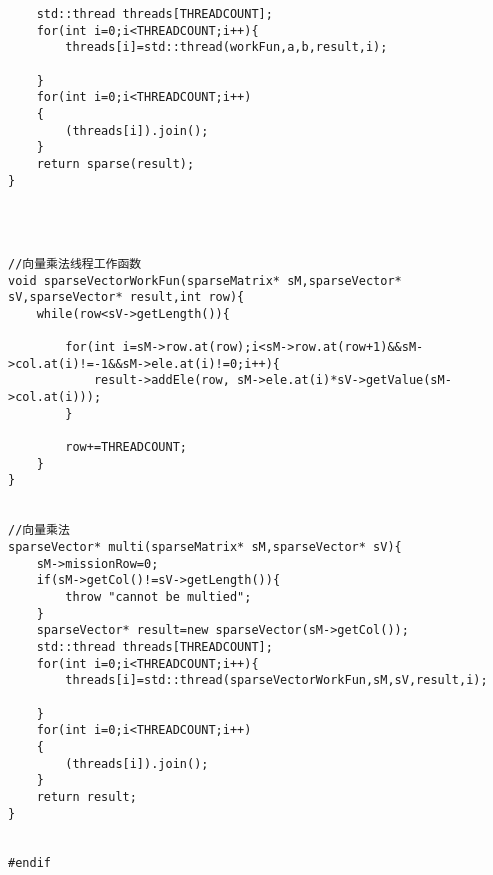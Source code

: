 \begin{lstlisting}
    std::thread threads[THREADCOUNT];
    for(int i=0;i<THREADCOUNT;i++){
        threads[i]=std::thread(workFun,a,b,result,i);
        
    }
    for(int i=0;i<THREADCOUNT;i++)
    {
        (threads[i]).join();
    }
    return sparse(result);
}




//向量乘法线程工作函数
void sparseVectorWorkFun(sparseMatrix* sM,sparseVector* sV,sparseVector* result,int row){
    while(row<sV->getLength()){
        
        for(int i=sM->row.at(row);i<sM->row.at(row+1)&&sM->col.at(i)!=-1&&sM->ele.at(i)!=0;i++){
            result->addEle(row, sM->ele.at(i)*sV->getValue(sM->col.at(i)));
        }
        
        row+=THREADCOUNT;
    }
}


//向量乘法
sparseVector* multi(sparseMatrix* sM,sparseVector* sV){
    sM->missionRow=0;
    if(sM->getCol()!=sV->getLength()){
        throw "cannot be multied";
    }
    sparseVector* result=new sparseVector(sM->getCol());
    std::thread threads[THREADCOUNT];
    for(int i=0;i<THREADCOUNT;i++){
        threads[i]=std::thread(sparseVectorWorkFun,sM,sV,result,i);
        
    }
    for(int i=0;i<THREADCOUNT;i++)
    {
        (threads[i]).join();
    }
    return result;
}


#endif


\end{lstlisting}




